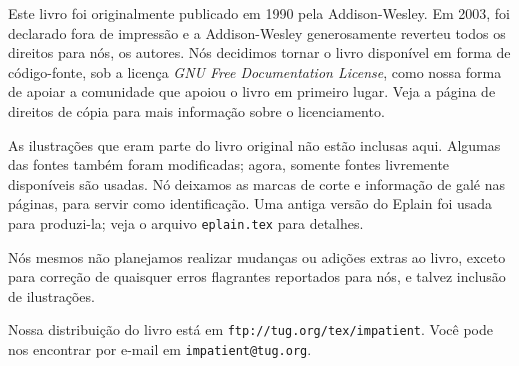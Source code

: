 
\baselineskip
 Este livro foi originalmente publicado
em 1990 pela Addison-Wesley. Em 2003, foi declarado fora de impressão e a
Addison-Wesley generosamente reverteu todos os direitos para nós, os
autores. Nós decidimos tornar o livro disponível em forma de código-fonte, sob a
licença {\it GNU Free Documentation License}, como nossa forma de apoiar a
comunidade que apoiou o livro em primeiro lugar. Veja a página de direitos de
cópia para mais informação sobre o licenciamento.

As ilustrações que eram parte do livro original não estão inclusas aqui. Algumas
das fontes também foram modificadas; agora, somente fontes livremente
disponíveis são usadas. Nó deixamos as marcas de corte e informação de galé nas
páginas, para servir como identificação. Uma antiga versão do Eplain foi usada
para produzi-la; veja o arquivo {\tt eplain.tex} para detalhes.

Nós mesmos não planejamos realizar mudanças ou adições extras ao livro, exceto
para correção de quaisquer erros flagrantes reportados para nós, e talvez
inclusão de ilustrações.

Nossa distribuição do livro está em {\tt ftp://tug.org/tex/impatient}. Você pode
nos encontrar por e-mail em {\tt impatient@tug.org}.

\pagebreak
\byebye
